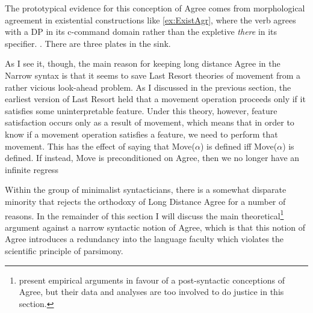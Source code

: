 \documentclass[MilwayThesis]{subfiles}
\begin{document}
The prototypical evidence for this conception of Agree comes from morphological agreement in existential constructions like \cref{ex:ExistAgr}, where the verb agrees with a DP in its c-command domain rather than the expletive \textit{there} in its specifier.
\ex.\label{ex:ExistAgr} There are three plates in the sink.

As I see it, though, the main reason for keeping long distance Agree in the Narrow syntax is that it seems to save Last Resort theories of movement from a rather vicious look-ahead problem.
As I discussed in the previous section, the earliest version of Last Resort held that a movement operation proceeds only if it satisfies some uninterpretable feature.
Under this theory, however, feature satisfaction occurs only as a result of movement, which means that in order to know if a movement operation satisfies a feature, we need to perform that movement.
This has the effect of saying that Move($\alpha$) is defined iff Move($\alpha$) is defined.
If instead, Move is preconditioned on Agree, then we no longer have an infinite regress

Within the group of minimalist syntacticians, there is a somewhat disparate minority that rejects the orthodoxy of Long Distance Agree for a number of reasons.
In the remainder of this section I will discuss the main theoretical\footnote{
	\textcite{bobaljik2008wheres,arregi2013contextual} present empirical arguments in favour of a post-syntactic conceptions of Agree, but their data and analyses are too involved to do justice in this section. 
} argument against a narrow syntactic notion of Agree, which is that this notion of Agree introduces a redundancy into the language faculty which violates the scientific principle of parsimony.
\end{document}
